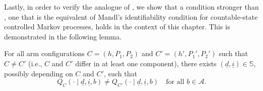 Lastly, in order to verify the analogue of \cite[Assumption A6.1]{borkar1982identification}, we show that a condition stronger than \cite[Assumption A6.1]{borkar1982identification}, one that is the equivalent of Mandl's identifiability condition for countable-state controlled Markov processes, holds in the context of this chapter. This is demonstrated in the following lemma.
\begin{lemma}
\label{lemma:mandl_identifiability_condition}
	For all arm configurations $C=(h, P_1, P_2)$ and $C'=(h', P_1', P_2')$ such that $C\neq C'$ (i.e., $C$ and $C'$ differ in at least one component), there exists $(\underline{d}, \underline{i})\in \mathbb{S}$, possibly depending on $C$ and $C'$, such that
\begin{equation}
	Q_C(\cdot \mid \underline{d}, \underline{i}, b) \neq Q_{C'}(\cdot \mid \underline{d}, \underline{i}, b)\quad \text{for all }b\in \mathcal{A}.
	\label{eq:Mandl_identifiability_condition}
\end{equation}
\end{lemma}
